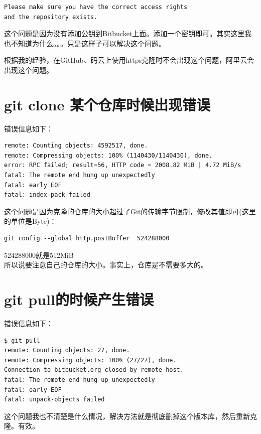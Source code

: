 \documentclass[a4paper,12pt]{ctexbook}
\begin{document}
\begin{flushleft}
\begin{verbatim}
Please make sure you have the correct access rights
and the repository exists.
\end{verbatim}
这个问题是因为没有添加公钥到Bitbucket上面。添加一个密钥即可。其实这里我也不知道为什么。。。只是这样子可以解决这个问题。

根据我的经验，在GitHub、码云上使用https克隆时不会出现这个问题，阿里云会出现这个问题。
\section{git clone 某个仓库时候出现错误}
错误信息如下：
\begin{verbatim}
remote: Counting objects: 4592517, done.
remote: Compressing objects: 100% (1140430/1140430), done.
error: RPC failed; result=56, HTTP code = 2008.82 MiB | 4.72 MiB/s
fatal: The remote end hung up unexpectedly
fatal: early EOF
fatal: index-pack failed
\end{verbatim}
这个问题是因为克隆的仓库的大小超过了Git的传输字节限制，修改其值即可(这里的单位是Byte)：\\
\begin{verbatim}
git config --global http.postBuffer  524288000
\end{verbatim}
524288000就是512MiB\\
所以说要注意自己的仓库的大小。事实上，仓库是不需要多大的。

\section{git pull的时候产生错误}
错误信息如下：
\begin{verbatim}
$ git pull
remote: Counting objects: 27, done.
remote: Compressing objects: 100% (27/27), done.
Connection to bitbucket.org closed by remote host.
fatal: The remote end hung up unexpectedly
fatal: early EOF
fatal: unpack-objects failed
\end{verbatim}
这个问题我也不清楚是什么情况，解决方法就是彻底删掉这个版本库，然后重新克隆。有效。
\end{flushleft}
\end{document}
